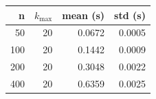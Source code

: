 \begin{tabular}{rrrr}\toprule
n & $k_{\max}$ & mean (s) & std (s)\\\midrule
50 & 20 & 0.0672 & 0.0005\\
100 & 20 & 0.1442 & 0.0009\\
200 & 20 & 0.3048 & 0.0022\\
400 & 20 & 0.6359 & 0.0025\\
\bottomrule\end{tabular}
